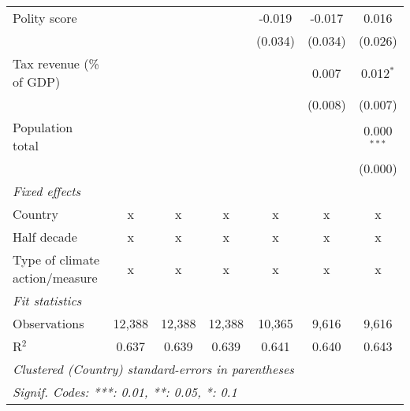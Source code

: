 \begin{tabular}{lcccccc}
   Polity score                                                                  &         &              &              & -0.019       & -0.017       & 0.016\\   
                                                                                 &         &              &              & (0.034)      & (0.034)      & (0.026)\\   
   Tax revenue (\% of GDP)                                                       &         &              &              &              & 0.007        & 0.012$^{*}$\\   
                                                                                 &         &              &              &              & (0.008)      & (0.007)\\   
   Population total                                                              &         &              &              &              &              & 0.000$^{***}$\\   
                                                                                 &         &              &              &              &              & (0.000)\\   
   \emph{Fixed effects}\\
   Country                                                                       & x       & x            & x            & x            & x            & x\\  
   Half decade                                                                   & x       & x            & x            & x            & x            & x\\  
   Type of climate action/measure                                                & x       & x            & x            & x            & x            & x\\  
   \midrule \emph{Fit statistics}\\
   Observations                                                                  & 12,388  & 12,388       & 12,388       & 10,365       & 9,616        & 9,616\\  
   R$^2$                                                                         & 0.637   & 0.639        & 0.639        & 0.641        & 0.640        & 0.643\\  
   \midrule
   \multicolumn{7}{l}{\emph{Clustered (Country) standard-errors in parentheses}}\\
   \multicolumn{7}{l}{\emph{Signif. Codes: ***: 0.01, **: 0.05, *: 0.1}}\\
\end{tabular}
\par\endgroup



